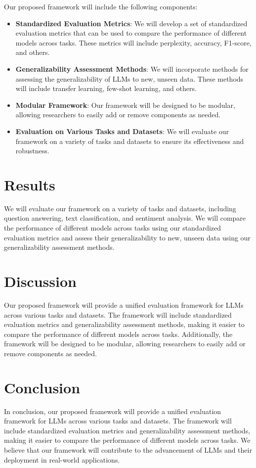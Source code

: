 \documentclass{article}
\begin{document}
Our proposed framework will include the following components:

\begin{itemize}

\item \textbf{Standardized Evaluation Metrics}: We will develop a set of standardized evaluation metrics that can be used to compare the performance of different models across tasks. These metrics will include perplexity, accuracy, F1-score, and others.

\item \textbf{Generalizability Assessment Methods}: We will incorporate methods for assessing the generalizability of LLMs to new, unseen data. These methods will include transfer learning, few-shot learning, and others.

\item \textbf{Modular Framework}: Our framework will be designed to be modular, allowing researchers to easily add or remove components as needed.

\item \textbf{Evaluation on Various Tasks and Datasets}: We will evaluate our framework on a variety of tasks and datasets to ensure its effectiveness and robustness.

\end{itemize}

\section{Results}

We will evaluate our framework on a variety of tasks and datasets, including question answering, text classification, and sentiment analysis. We will compare the performance of different models across tasks using our standardized evaluation metrics and assess their generalizability to new, unseen data using our generalizability assessment methods.

\section{Discussion}

Our proposed framework will provide a unified evaluation framework for LLMs across various tasks and datasets. The framework will include standardized evaluation metrics and generalizability assessment methods, making it easier to compare the performance of different models across tasks. Additionally, the framework will be designed to be modular, allowing researchers to easily add or remove components as needed.

\section{Conclusion}

In conclusion, our proposed framework will provide a unified evaluation framework for LLMs across various tasks and datasets. The framework will include standardized evaluation metrics and generalizability assessment methods, making it easier to compare the performance of different models across tasks. We believe that our framework will contribute to the advancement of LLMs and their deployment in real-world applications.
\end{document}
